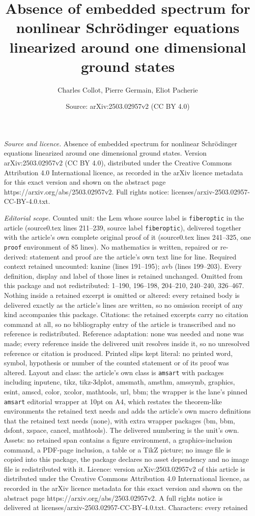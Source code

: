 \documentclass[10pt,a4paper]{amsart}
\title[Absence of embedded spectrum for nonlinear Schr\"odinger equ]{Absence of embedded spectrum for nonlinear Schr\"odinger equations linearized around one dimensional ground states}
\author{Charles Collot, Pierre Germain, Eliot Pacherie}
\date{Source: arXiv:2503.02957v2 (CC BY 4.0)}
\begin{document}
\maketitle

\noindent\emph{Source and licence.} Absence of embedded spectrum for nonlinear Schr\"odinger equations linearized around one dimensional ground states. Version arXiv:2503.02957v2 (CC BY 4.0), distributed under the Creative Commons Attribution 4.0 International licence, as recorded in the arXiv licence metadata for this exact version and shown on the abstract page https://arxiv.org/abs/2503.02957v2. Full rights notice: licenses/arxiv-2503.02957-CC-BY-4.0.txt.\par\smallskip

\noindent\textit{Editorial scope.} Counted unit: the Lem whose source label is \texttt{fiberoptic} in the article (source0.tex lines 211--239, source label \texttt{fiberoptic}), delivered together with the article's own complete original proof of it (source0.tex lines 241--325, one \texttt{proof} environment of 85 lines). No mathematics is written, repaired or re-derived: statement and proof are the article's own text line for line. Required context retained uncounted: kanine (lines 191--195); avb (lines 199--203). Every definition, display and label of those lines is retained unchanged. Omitted from this package and not redistributed: 1--190, 196--198, 204--210, 240--240, 326--467. Nothing inside a retained excerpt is omitted or altered: every retained body is delivered exactly as the article's lines are written, so no omission receipt of any kind accompanies this package. Citations: the retained excerpts carry no citation command at all, so no bibliography entry of the article is transcribed and no reference is redistributed. Reference adaptation: none was needed and none was made; every reference inside the delivered unit resolves inside it, so no unresolved reference or citation is produced. Printed slips kept literal: no printed word, symbol, hypothesis or number of the counted statement or of its proof was altered. Layout and class: the article's own class is \texttt{amsart} with packages including inputenc, tikz, tikz-3dplot, amsmath, amsthm, amssymb, graphics, esint, amscd, color, xcolor, mathtools, url, bbm; the wrapper is the lane's pinned \texttt{amsart} editorial wrapper at 10pt on A4, which restates the theorem-like environments the retained text needs and adds the article's own macro definitions that the retained text needs (none), with extra wrapper packages (bm, bbm, dsfont, xspace, cancel, mathtools). The delivered numbering is the unit's own. Assets: no retained span contains a figure environment, a graphics-inclusion command, a PDF-page inclusion, a table or a TikZ picture; no image file is copied into this package, the package declares no asset dependency and no image file is redistributed with it. Licence: version arXiv:2503.02957v2 of this article is distributed under the Creative Commons Attribution 4.0 International licence, as recorded in the arXiv licence metadata for this exact version and shown on the abstract page https://arxiv.org/abs/2503.02957v2. A full rights notice is delivered at licenses/arxiv-2503.02957-CC-BY-4.0.txt. Characters: every retained 
\end{document}
